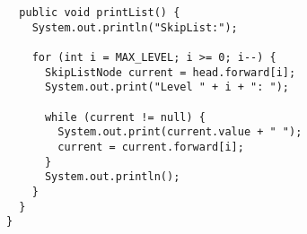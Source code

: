 \begin{verbatim}
  public void printList() {
    System.out.println("SkipList:");

    for (int i = MAX_LEVEL; i >= 0; i--) {
      SkipListNode current = head.forward[i];
      System.out.print("Level " + i + ": ");

      while (current != null) {
        System.out.print(current.value + " ");
        current = current.forward[i];
      }
      System.out.println();
    }
  }
}
\end{verbatim}
